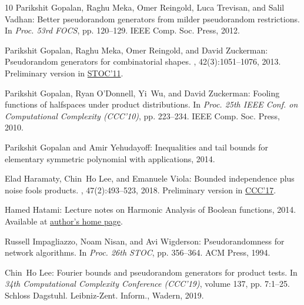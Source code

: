 \documentclass[11pt]{article}
\numberwithin{equation}{section}
\theoremstyle{definition}
\theoremstyle{plain}
\begin{document}
\begin{thebibliography}{10}
{\sc Parikshit Gopalan, Raghu Meka, Omer Reingold, Luca Trevisan, and Salil
  Vadhan}: Better pseudorandom generators from milder pseudorandom
  restrictions.
\newblock In {\em Proc. 53rd FOCS}, pp. 120--129. IEEE Comp. Soc. Press, 2012.

{\sc Parikshit Gopalan, Raghu Meka, Omer Reingold, and David Zuckerman}:
  Pseudorandom generators for combinatorial shapes.
, 42(3):1051--1076, 2013.
\newblock Preliminary version in
  \href{https://doi.org/10.1145/1993636.1993671}{STOC'11}.
\newblock [\epfmtdoi{10.1137/110854990}]

{\sc Parikshit Gopalan, Ryan O'Donnell, Yi~Wu, and David Zuckerman}: Fooling
  functions of halfspaces under product distributions.
\newblock In {\em Proc. 25th IEEE Conf. on Computational Complexity (CCC'10)},
  pp. 223--234. IEEE Comp. Soc. Press, 2010.

{\sc Parikshit Gopalan and Amir Yehudayoff}: Inequalities and tail bounds for
  elementary symmetric polynomial with applications, 2014.

{\sc Elad Haramaty, Chin~Ho Lee, and Emanuele Viola}: Bounded independence plus
  noise fools products.
, 47(2):493--523, 2018.
\newblock Preliminary version in
  \href{https://doi.org/10.4230/LIPIcs.CCC.2017.14}{CCC'17}.
\newblock [\epfmtdoi{10.1137/17M1129088}]

{\sc Hamed Hatami}: Lecture notes on {H}armonic {A}nalysis of {B}oolean
  functions, 2014.
\newblock Available at
  \href{http://cs.mcgill.ca/~hatami/comp760-2014/lectures.pdf}{author's home
  page}.

{\sc Russell Impagliazzo, Noam Nisan, and Avi Wigderson}: Pseudorandomness for
  network algorithms.
\newblock In {\em Proc. 26th STOC}, pp. 356--364. ACM Press, 1994.
\newblock [\epfmtdoi{10.1145/195058.195190}]

{\sc Chin~Ho Lee}: Fourier bounds and pseudorandom generators for product
  tests.
\newblock In {\em 34th {C}omputational {C}omplexity {C}onference ({CCC}'19)},
  volume 137, pp. 7:1--25. Schloss Dagstuhl. Leibniz-Zent. Inform., Wadern,
  2019.


\end{thebibliography}
\end{document}
